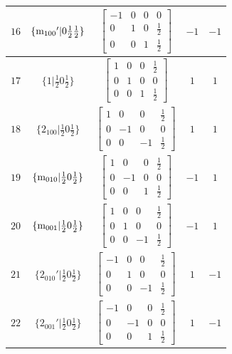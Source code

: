 \documentclass[fleqn,8pt]{jsarticle}
\begin{document}
\begin{longtable}{ccccc}
$ 16 $ & $ \{{\rm m}_{100}{}'|0 \frac{1}{2} \frac{1}{2}\} $ & $ \begin{bmatrix} -1 & 0 & 0 & 0 \\ 0 & 1 & 0 & \frac{1}{2} \\ 0 & 0 & 1 & \frac{1}{2} \end{bmatrix} $ & $ -1 $ & $ -1 $ \\ \hline
$ 17 $ & $ \{1|\frac{1}{2} 0 \frac{1}{2}\} $ & $ \begin{bmatrix} 1 & 0 & 0 & \frac{1}{2} \\ 0 & 1 & 0 & 0 \\ 0 & 0 & 1 & \frac{1}{2} \end{bmatrix} $ & $ 1 $ & $ 1 $ \\ \hline
$ 18 $ & $ \{2{}_{100}|\frac{1}{2} 0 \frac{1}{2}\} $ & $ \begin{bmatrix} 1 & 0 & 0 & \frac{1}{2} \\ 0 & -1 & 0 & 0 \\ 0 & 0 & -1 & \frac{1}{2} \end{bmatrix} $ & $ 1 $ & $ 1 $ \\ \hline
$ 19 $ & $ \{{\rm m}_{010}|\frac{1}{2} 0 \frac{1}{2}\} $ & $ \begin{bmatrix} 1 & 0 & 0 & \frac{1}{2} \\ 0 & -1 & 0 & 0 \\ 0 & 0 & 1 & \frac{1}{2} \end{bmatrix} $ & $ -1 $ & $ 1 $ \\ \hline
$ 20 $ & $ \{{\rm m}_{001}|\frac{1}{2} 0 \frac{1}{2}\} $ & $ \begin{bmatrix} 1 & 0 & 0 & \frac{1}{2} \\ 0 & 1 & 0 & 0 \\ 0 & 0 & -1 & \frac{1}{2} \end{bmatrix} $ & $ -1 $ & $ 1 $ \\ \hline
$ 21 $ & $ \{2{}_{010}{}'|\frac{1}{2} 0 \frac{1}{2}\} $ & $ \begin{bmatrix} -1 & 0 & 0 & \frac{1}{2} \\ 0 & 1 & 0 & 0 \\ 0 & 0 & -1 & \frac{1}{2} \end{bmatrix} $ & $ 1 $ & $ -1 $ \\ \hline
$ 22 $ & $ \{2{}_{001}{}'|\frac{1}{2} 0 \frac{1}{2}\} $ & $ \begin{bmatrix} -1 & 0 & 0 & \frac{1}{2} \\ 0 & -1 & 0 & 0 \\ 0 & 0 & 1 & \frac{1}{2} \end{bmatrix} $ & $ 1 $ & $ -1 $ \\ \hline

\end{longtable}
\end{document}
